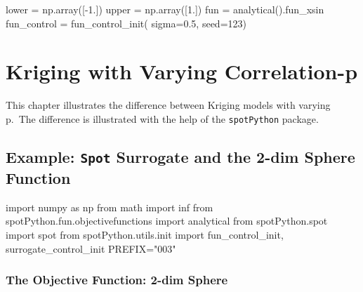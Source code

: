 \documentclass[
  letterpaper,
  DIV=11,
  numbers=noendperiod]{scrreprt}
\newenvironment{Shaded}{\begin{snugshade}}{\end{snugshade}}
\newcommand{\DecValTok}[1]{\textcolor[rgb]{0.68,0.00,0.00}{#1}}
\newcommand{\FloatTok}[1]{\textcolor[rgb]{0.68,0.00,0.00}{#1}}
\newcommand{\ImportTok}[1]{\textcolor[rgb]{0.00,0.46,0.62}{#1}}
\newcommand{\NormalTok}[1]{\textcolor[rgb]{0.00,0.23,0.31}{#1}}
\newcommand{\OperatorTok}[1]{\textcolor[rgb]{0.37,0.37,0.37}{#1}}
\newcommand{\StringTok}[1]{\textcolor[rgb]{0.13,0.47,0.30}{#1}}
\begin{document}
\begin{Shaded}
\begin{Highlighting}[]
\NormalTok{lower }\OperatorTok{=}\NormalTok{ np.array([}\OperatorTok{{-}}\FloatTok{1.}\NormalTok{])}
\NormalTok{upper }\OperatorTok{=}\NormalTok{ np.array([}\FloatTok{1.}\NormalTok{])}
\NormalTok{fun }\OperatorTok{=}\NormalTok{ analytical().fun\_xsin}
\NormalTok{fun\_control }\OperatorTok{=}\NormalTok{ fun\_control\_init(    }
\NormalTok{    sigma}\OperatorTok{=}\FloatTok{0.5}\NormalTok{,}
\NormalTok{    seed}\OperatorTok{=}\DecValTok{123}\NormalTok{)}
\end{Highlighting}
\end{Shaded}

\chapter{Kriging with Varying
Correlation-p}\label{sec-num-spot-correlation-p}

This chapter illustrates the difference between Kriging models with
varying p.~The difference is illustrated with the help of the
\texttt{spotPython} package.

\section{\texorpdfstring{Example: \texttt{Spot} Surrogate and the 2-dim
Sphere
Function}{Example: Spot Surrogate and the 2-dim Sphere Function}}\label{example-spot-surrogate-and-the-2-dim-sphere-function}

\begin{Shaded}
\begin{Highlighting}[]
\ImportTok{import}\NormalTok{ numpy }\ImportTok{as}\NormalTok{ np}
\ImportTok{from}\NormalTok{ math }\ImportTok{import}\NormalTok{ inf}
\ImportTok{from}\NormalTok{ spotPython.fun.objectivefunctions }\ImportTok{import}\NormalTok{ analytical}
\ImportTok{from}\NormalTok{ spotPython.spot }\ImportTok{import}\NormalTok{ spot}
\ImportTok{from}\NormalTok{ spotPython.utils.init }\ImportTok{import}\NormalTok{ fun\_control\_init, surrogate\_control\_init}
\NormalTok{PREFIX}\OperatorTok{=}\StringTok{"003"}
\end{Highlighting}
\end{Shaded}

\subsection{The Objective Function: 2-dim
Sphere}\label{the-objective-function-2-dim-sphere-1}
\end{document}
